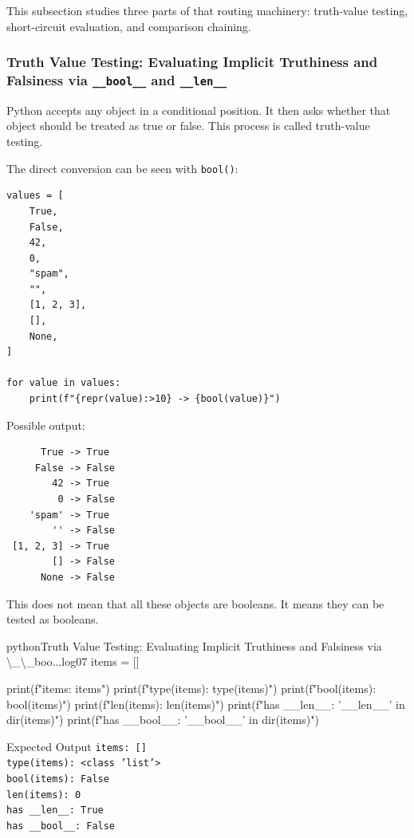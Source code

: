 \documentclass[a4paper,twoside]{report}
\begin{document}
This subsection studies three parts of that routing machinery: truth-value testing, short-circuit evaluation, and comparison chaining.

\subsubsection{Truth Value Testing: Evaluating Implicit Truthiness and Falsiness via \texttt{\_\_bool\_\_} and \texttt{\_\_len\_\_}}

Python accepts any object in a conditional position. It then asks whether that object should be treated as true or false. This process is called truth-value testing.

The direct conversion can be seen with \texttt{bool()}:

\begin{verbatim}
values = [
    True,
    False,
    42,
    0,
    "spam",
    "",
    [1, 2, 3],
    [],
    None,
]

for value in values:
    print(f"{repr(value):>10} -> {bool(value)}")
\end{verbatim}

Possible output:

\begin{verbatim}
      True -> True
     False -> False
        42 -> True
         0 -> False
    'spam' -> True
        '' -> False
 [1, 2, 3] -> True
        [] -> False
      None -> False
\end{verbatim}

This does not mean that all these objects are booleans. It means they can be tested as booleans.

\begin{codebox}[]{python}{Truth Value Testing: Evaluating Implicit Truthiness and Falsiness via \textbackslash{}\_\textbackslash{}\_boo...}{log07}
items = []

print(f"items: {items}")
print(f"type(items): {type(items)}")
print(f"bool(items): {bool(items)}")
print(f"len(items): {len(items)}")
print(f"has __len__: {'__len__' in dir(items)}")
print(f"has __bool__: {'__bool__' in dir(items)}")
\end{codebox}


\begin{iobox}{Expected Output}
\texttt{items: []} \\
\texttt{type(items): <class 'list'>} \\
\texttt{bool(items): False} \\
\texttt{len(items): 0} \\
\texttt{has \_\_len\_\_: True} \\
\texttt{has \_\_bool\_\_: False} \\
\end{iobox}
\end{document}
